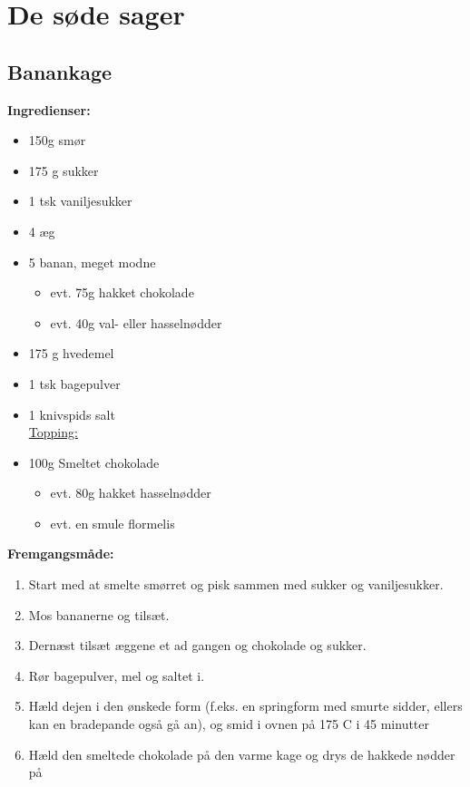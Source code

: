 \documentclass{book}
\begin{document}
\chapter{De søde sager}
\minitoc
\newpage\section{Banankage}
\begin{minipage}[t]{0.5\textwidth}
\textbf{Ingredienser:}
\begin{itemize}
  \item 150g smør
  \item 175 g sukker
  \item 1 tsk vaniljesukker
  \item 4 æg
  \item 5 banan, meget modne
  \begin{itemize}
    \item evt. 75g hakket chokolade
    \item evt. 40g val- eller hasselnødder
  \end{itemize}
  \item  175 g hvedemel
   \item1  tsk bagepulver
   \item 1 knivspids salt 
\\ \underline{Topping:}
 \item 100g Smeltet chokolade
\begin{itemize}
    \item evt. 80g hakket hasselnødder
    \item evt. en smule flormelis
\end{itemize} 
\end{itemize}
\end{minipage}
\begin{minipage}[t]{0.5\textwidth}
\textbf{Fremgangsmåde:}
\begin{enumerate}
   \item  Start med at smelte smørret og pisk sammen med sukker og vaniljesukker. 
   \item  Mos bananerne og tilsæt.
   \item  Dernæst tilsæt æggene et ad gangen og chokolade og sukker.
   \item  Rør bagepulver, mel og saltet i.
   \item  Hæld dejen i den ønskede form (f.eks. en springform med smurte sidder, ellers kan en bradepande også gå an), og smid i ovnen på 175 \degree C i 45 minutter
   \item  Hæld den smeltede chokolade på den varme kage og drys de hakkede nødder på 
\end{enumerate}
\end{minipage}
\end{document}
